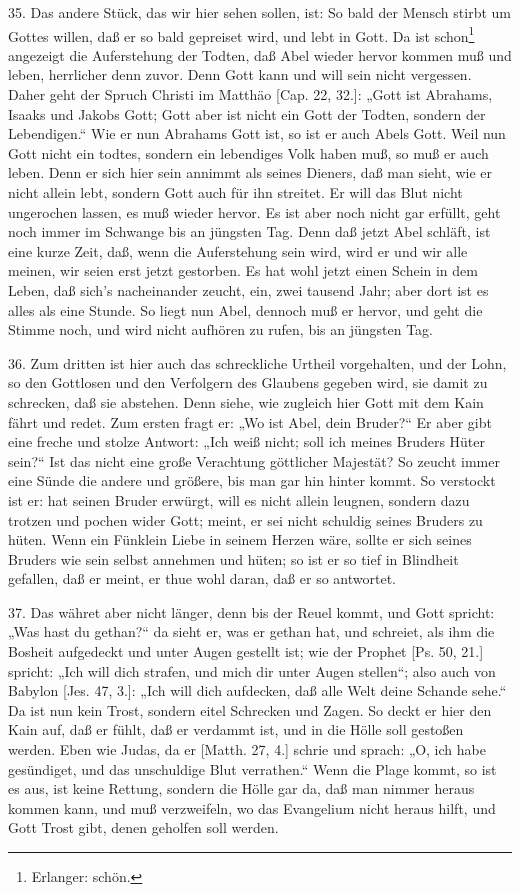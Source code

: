 35. Das andere Stück, das wir hier sehen sollen, ist: So bald der Mensch stirbt um Gottes willen, daß er so bald gepreiset wird, und lebt in Gott. Da ist schon\footnote{Erlanger: schön.} angezeigt die Auferstehung der Todten, daß Abel wieder hervor kommen muß und leben, herrlicher denn zuvor. Denn Gott kann und will sein nicht vergessen. Daher geht der Spruch Christi im Matthäo [Cap. 22, 32.]: „Gott ist Abrahams, Isaaks und Jakobs Gott; Gott aber ist nicht ein Gott der Todten, sondern der Lebendigen.“ Wie er nun Abrahams Gott ist, so ist er auch Abels Gott. Weil nun Gott nicht ein todtes, sondern ein lebendiges Volk haben muß, so muß er auch leben. Denn er sich hier sein annimmt als seines Dieners, daß man sieht, wie er nicht allein lebt, sondern Gott auch für ihn streitet. Er will das Blut nicht ungerochen lassen, es muß wieder hervor. Es ist aber noch nicht gar erfüllt, geht noch immer im Schwange bis an jüngsten Tag. Denn daß jetzt Abel schläft, ist eine kurze Zeit, daß, wenn die Auferstehung sein wird, wird er und wir alle meinen, wir seien erst jetzt gestorben. Es hat wohl jetzt einen Schein in dem Leben, daß sich’s nacheinander zeucht, ein, zwei tausend Jahr; aber dort ist es alles als eine Stunde. So liegt nun Abel, dennoch muß er hervor, und geht die Stimme noch, und wird nicht aufhören zu rufen, bis an jüngsten Tag.

36. Zum dritten ist hier auch das schreckliche Urtheil vorgehalten, und der Lohn, so den Gottlosen und den Verfolgern des Glaubens gegeben wird, sie damit zu schrecken, daß sie abstehen. Denn siehe, wie zugleich hier Gott mit dem Kain fährt und redet. Zum ersten fragt er: „Wo ist Abel, dein Bruder?“ Er aber gibt eine freche und stolze Antwort: „Ich weiß nicht; soll ich meines Bruders Hüter sein?“ Ist das nicht eine große Verachtung göttlicher Majestät? So zeucht immer eine Sünde die andere und größere, bis man gar hin hinter kommt. So verstockt ist er: hat seinen Bruder erwürgt, will es nicht allein leugnen, sondern dazu trotzen und pochen wider Gott; meint, er sei nicht schuldig seines Bruders zu hüten. Wenn ein Fünklein Liebe in seinem Herzen wäre, sollte er sich seines Bruders wie sein selbst annehmen und hüten; so ist er so tief in Blindheit gefallen, daß er meint, er thue wohl daran, daß er so antwortet.

37. Das währet aber nicht länger, denn bis der Reuel kommt, und Gott spricht: „Was hast du gethan?“ da sieht er, was er gethan hat, und schreiet, als ihm die Bosheit aufgedeckt und unter Augen gestellt ist; wie der Prophet [Ps. 50, 21.] spricht: „Ich will dich strafen, und mich dir unter Augen stellen“; also auch von Babylon [Jes. 47, 3.]: „Ich will dich aufdecken, daß alle Welt deine Schande sehe.“ Da ist nun kein Trost, sondern eitel Schrecken und Zagen. So deckt er hier den Kain auf, daß er fühlt, daß er verdammt ist, und in die Hölle soll gestoßen werden. Eben wie Judas, da er [Matth. 27, 4.] schrie und sprach: „O, ich habe gesündiget, und das unschuldige Blut verrathen.“ Wenn die Plage kommt, so ist es aus, ist keine Rettung, sondern die Hölle gar da, daß man nimmer heraus kommen kann, und muß verzweifeln, wo das Evangelium nicht heraus hilft, und Gott Trost gibt, denen geholfen soll werden.

